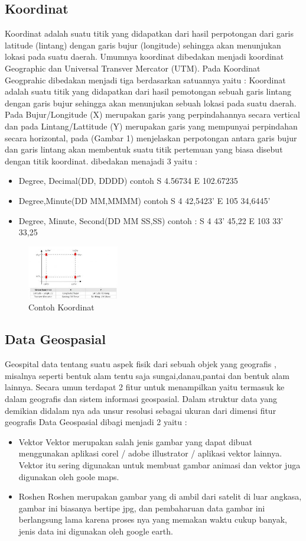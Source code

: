 \subsection{Koordinat}
Koordinat adalah suatu titik yang didapatkan dari hasil perpotongan dari garis latitude (lintang) dengan garis bujur (longitude) sehingga akan menunjukan lokasi pada suatu daerah. Umumnya koordinat dibedakan menjadi koordinat Geographic dan Universal Transver Mercator (UTM). Pada Koordinat Geogprahic dibedakan menjadi tiga berdasarkan satuannya yaitu :
Koordinat adalah suatu titik yang didapatkan dari hasil pemotongan sebuah garis lintang dengan garis bujur sehingga akan menunjukan sebuah lokasi pada suatu daerah. Pada Bujur/Longitude (X) merupakan garis yang perpindahannya secara vertical dan pada Lintang/Lattitude (Y) merupakan garis yang mempunyai perpindahan secara horizontal, pada (Gambar 1) menjelaskan perpotongan antara garis bujur dan garis lintang akan membentuk suatu titik pertemuan yang biasa disebut dengan titik koordinat.
dibedakan menajadi 3 yaitu : 
\begin{itemize}
	\item Degree, Decimal(DD, DDDD) contoh S 4.56734 E 102.67235
	\item Degree,Minute(DD MM,MMMM) contoh S 4 42,5423’ E 105 34,6445’
	\item Degree, Minute, Second(DD MM SS,SS) contoh : S 4 43’ 45,22 E 103 33’ 33,25
\end{itemize}
\hfill\break
\begin{figure}[H]
	\includegraphics[width=4cm]{figures/1174003/koordinat.jpg}
	\centering
	\caption{Contoh Koordinat}
\end{figure}

\subsection{Data Geospasial}
Geospital data tentang suatu aspek fisik dari sebuah objek yang geografis , misalnya seperti bentuk alam tentu saja sungai,danau,pantai dan bentuk alam lainnya. Secara umun terdapat 2 fitur untuk menampilkan yaitu termasuk ke dalam geografis dan sistem informasi geospasial. Dalam struktur data yang demikian didalam nya ada unsur resolusi sebagai ukuran dari dimensi fitur geografis
Data Geospasial dibagi menjadi 2 yaitu :
\begin{itemize}
	\item Vektor
	Vektor merupakan salah jenis gambar yang dapat dibuat menggunakan aplikasi corel / adobe illustrator / aplikasi vektor lainnya.
	Vektor itu sering digunakan untuk membuat gambar animasi dan vektor juga digunakan oleh goole maps.
	\item Roshen
	Roshen merupakan gambar yang di ambil dari satelit di luar angkasa, gambar ini biasanya bertipe jpg, dan pembaharuan data gambar ini berlangsung lama karena proses nya yang memakan waktu cukup banyak, jenis data ini digunakan oleh google earth.
\end{itemize}
